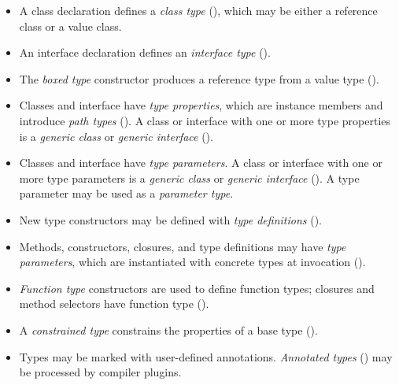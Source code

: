 \begin{itemize}
\item A class declaration defines a \emph{class type}
(), which
may be either a reference class or a value class.
\item An interface declaration defines an \emph{interface type}
().
\item The \emph{boxed type} constructor produces a reference
type from a value type ().
\iftypeparams\else
\item Classes and interface have \emph{type properties}, which
are instance members and introduce \emph{path types}
().
A class or interface with one or more type properties is a
\emph{generic class} or \emph{generic interface}
().
\fi
\iftypeparams
\item Classes and interface have \emph{type parameters}.
A class or interface with one or more type parameters is a
\emph{generic class} or \emph{generic interface}
().  A type parameter may be used as 
a \emph{parameter type}.
\fi
\item New type constructors may be defined with \emph{type definitions}
().
\item Methods, constructors, closures, and type definitions may
have \emph{type parameters}, which are instantiated with
concrete types at invocation ().
\item \emph{Function type} constructors are used to define
function types; closures and method selectors have function
type ().
\item A \emph{constrained type} constrains the properties of
a base type ().
\item Types may be marked with user-defined annotations.
\emph{Annotated types} ()
may be processed by compiler plugins.
\end{itemize}

